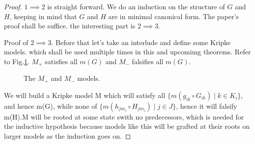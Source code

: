 \documentclass[10pt]{article}
\begin{document}
		\begin{proof}
			$1 \implies 2$ is straight forward. We do an induction on the structure of $G$ and $H$, keeping in mind that $G$ and $H$ are in minimal canonical form. The paper's proof shall be suffice. the interesting part is $2 \implies 3$.
			
			Proof of $2 \implies 3$. Before that let's take an interlude and define some Kripke models. which shall be used multiple times in this and upcomimg theorems. Refer to Fig.\ref{fig:M+M-}. $M_+$ satisfies all $m(G)$ and $M_-$ falsifies all $m(G)$.
			
			\begin{figure}[ht]
				\centering
				\begin{subfigure}[c]{0.9\textwidth}
					\centering
				\end{subfigure}
				\caption{The $M_+$ and $M_-$ models.}
				\label{fig:M+M-}
			\end{figure}
			
			We will build a Kripke model M which will satisfy all $\{m(g_{ik} \circ G_{ik})\mid k\in K_i\}$, and hence m(G), while none of $\{m(h_{jm_i} \circ H_{jm_i})\mid j \in J\}$, hence it will
			falsify m(H).M will be rooted at some state swith no predecessors, which is needed for the inductive hypothesis because models like this will be grafted at their roots on larger models as the induction goes on. 
			

\end{proof}
\end{document}

